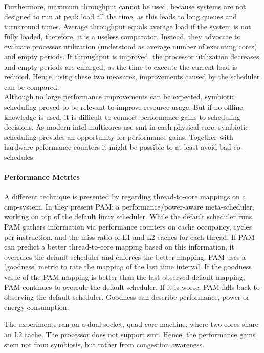Furthermore, maximum throughput cannot be used, because systems are not
designed to run at peak load all the time, as this leads to long queues and
turnaround times.
Average throughput equals average load if the system is not fully loaded,
therefore, it is a useless comparator.
Instead, they advocate to evaluate processor utilization (understood as average
number of executing cores) and empty periods.
If throughput is improved, the processor utilization decreases and empty
periods are enlarged, as the time to execute the current load is reduced.
Hence, using these two measures, improvements caused by the scheduler can be
compared.
\\

Although no large performance improvements can be expected, symbiotic
scheduling proved to be relevant to improve resource usage.
But if no offline knowledge is used, it is difficult to connect performance
gains to scheduling decisions.
As modern \gls{intel} multicores use \gls{smt} in each physical core, symbiotic
scheduling provides an opportunity for performance gains.
Together with hardware peformance counters it might be possible to at least
avoid bad co-schedules.
\\

\paragraph{Performance Metrics}
A different technique is presented by \citeauthor{banikazemi_pam_2008}
regarding thread-to-core mappings on a \gls{cmp}-system.
In \cite{banikazemi_pam_2008} they present PAM: a performance/power-aware
meta-scheduler, working on top of the default linux scheduler.
While the default scheduler runs, PAM gathers information via performance
counters on cache occupancy, cycles per instruction, and the miss ratio of L1
and L2 caches for each thread.
If PAM can predict a better thread-to-core mapping based on this information,
it overrules the default scheduler and enforces the better mapping.
PAM uses a 'goodness' metric to rate the mapping of the last time interval.
If the goodness value of the PAM mapping is better than the last observed
default mapping, PAM continues to overrule the default scheduler.
If it is worse, PAM falls back to observing the default scheduler.
Goodness can describe performance, power or energy consumption.

The experiments ran on a dual socket, quad-core machine, where two cores
share an L2 cache.
The processor does not support \gls{smt}.
Hence, the performance gains stem not from symbiosis, but rather from
congestion awareness.
\\

